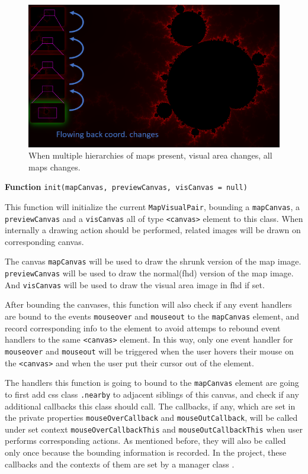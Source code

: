 \begin{figure}[th]
\centering
\includegraphics[width=\textwidth,keepaspectratio]{Figures/Chapter4/mvp-pairflow.png}
\decoRule
\caption[Pairing Multiple Levels of \glspl{map}]{When multiple hierarchies of \glspl{map} present, visual area changes, all \glspl{map} changes.}
\label{fig:mvp-pairflow}
\end{figure}

\textbf{Function} \verb|init(mapCanvas, previewCanvas, visCanvas = null)|

This function will initialize the current \texttt{MapVisualPair}, bounding a \texttt{mapCanvas}, a \texttt{previewCanvas} and a \texttt{visCanvas} all of type \texttt{<canvas>} element to this class. When internally a drawing action should be performed, related images will be drawn on corresponding canvas.

The canvas \texttt{mapCanvas} will be used to draw the shrunk version of the \gls{map} image. \texttt{previewCanvas} will be used to draw the normal(\gls{fhd}) version of the \gls{map} image. And \texttt{visCanvas} will be used to draw the visual area image in \gls{fhd} if set.

After bounding the canvases, this function will also check if any event handlers are bound to the events \texttt{mouseover} and \texttt{mouseout} to the \texttt{mapCanvas} element, and record corresponding info to the element to avoid attemps to rebound event handlers to the same \texttt{<canvas>} element. In this way, only one event handler for \texttt{mouseover} and \texttt{mouseout} will be triggered when the user hovers their mouse on the \texttt{<canvas>} and when the user put their cursor out of the element.

The handlers this function is going to bound to the \texttt{mapCanvas} element are going to first add \gls{css} class \texttt{.nearby} to adjacent siblings of this canvas, and check if any additional callbacks this class should call. The callbacks, if any, which are set in the private properties \texttt{mouseOverCallback} and \texttt{mouseOutCallback}, will be called under set context \texttt{mouseOverCallbackThis} and \texttt{mouseOutCallbackThis} when user performs corresponding actions. As mentioned before, they will also be called only once because the bounding information is recorded. In the project, these callbacks and the contexts of them are set by a manager class .

